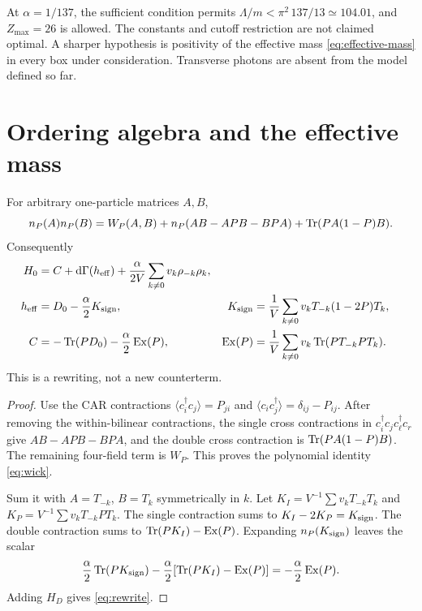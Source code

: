 At $\alpha=1/137$, the sufficient condition permits
$\Lambda/m<\pi^2\,137/13\simeq104.01$, and $Z_{\max}=26$ is allowed.
The constants and cutoff restriction are not claimed optimal.
A sharper hypothesis is positivity of the effective mass
\eqref{eq:effective-mass} in every box under consideration.
Transverse photons are absent from the model defined so far.

\section{Ordering algebra and the effective mass}
\label{sec:ordering}
\begin{lemma}\label{lem:wick}
For arbitrary one-particle matrices $A,B$,
\begin{equation}
n_P(A)n_P(B)=W_P(A,B)+n_P(AB-APB-BPA)
+\operatorname{Tr}(PA(1-P)B).
\label{eq:wick}
\end{equation}
Consequently
\begin{align}
H_0&=C+\mathrm d\Gamma(h_{\mathrm{eff}})
+\frac{\alpha}{2V}\sum_{k\ne0}v_k\rho_{-k}\rho_k,
\label{eq:rewrite}\\
h_{\mathrm{eff}}&=D_0-\frac\alpha2K_{\rm sign},&
K_{\rm sign}&=\frac1V\sum_{k\ne0}v_kT_{-k}(1-2P)T_k,\\
C&=-\operatorname{Tr}(PD_0)-\frac\alpha2\operatorname{Ex}(P),&
\operatorname{Ex}(P)&=\frac1V\sum_{k\ne0}v_k\operatorname{Tr}(PT_{-k}PT_k).
\label{eq:constant}
\end{align}
This is a rewriting, not a new counterterm.
\end{lemma}
\begin{proof}
Use the CAR contractions
$\langle c_i^\dagger c_j\rangle=P_{ji}$ and
$\langle c_i c_j^\dagger\rangle=\delta_{ij}-P_{ij}$.
After removing the within-bilinear contractions, the single cross
contractions in $c_i^\dagger c_jc_\ell^\dagger c_r$ give
$AB-APB-BPA$, and the double cross contraction is
$\operatorname{Tr}(PA(1-P)B)$. The remaining four-field term is $W_P$.
This proves the polynomial identity \eqref{eq:wick}.

Sum it with $A=T_{-k}$, $B=T_k$ symmetrically in $k$.
Let $K_I=V^{-1}\sum v_kT_{-k}T_k$ and
$K_P=V^{-1}\sum v_kT_{-k}PT_k$.
The single contraction sums to $K_I-2K_P=K_{\rm sign}$.
The double contraction sums to $\operatorname{Tr}(PK_I)-\operatorname{Ex}(P)$.
Expanding $n_P(K_{\rm sign})$ leaves the scalar
\[
\frac\alpha2\operatorname{Tr}(PK_{\rm sign})
-\frac\alpha2[\operatorname{Tr}(PK_I)-\operatorname{Ex}(P)]=-\frac\alpha2\operatorname{Ex}(P).
\]
Adding $H_D$ gives \eqref{eq:rewrite}.
\end{proof}


